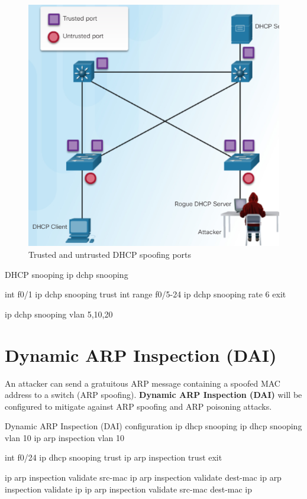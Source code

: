 \begin{figure}[hbtp]
\caption{Trusted and untrusted DHCP spoofing ports}\label{DHCPspoofing}
\centering
\includegraphics[scale=0.5]{pictures/DHCPspoofing.PNG}
\end{figure}

\begin{sexylisting}{DHCP snooping}
ip dchp snooping
 
int f0/1
ip dchp snooping trust
int range f0/5-24
ip dchp snooping rate 6
exit

ip dchp snooping vlan 5,10,20
\end{sexylisting}


\section{Dynamic ARP Inspection (DAI)}

An attacker can send a gratuitous ARP message containing a spoofed MAC address to a switch (ARP spoofing). \textbf{Dynamic ARP Inspection (DAI)} will be configured to mitigate against ARP spoofing and ARP poisoning attacks.

\begin{sexylisting}{Dynamic ARP Inspection (DAI) configuration}
ip dhcp snooping
ip dhcp snooping vlan 10
ip arp inspection vlan 10

int f0/24
ip dhcp snooping trust
ip arp inspection trust
exit

ip arp inspection validate src-mac
ip arp inspection validate dest-mac
ip arp inspection validate ip
ip arp inspection validate src-mac dest-mac ip
\end{sexylisting}

